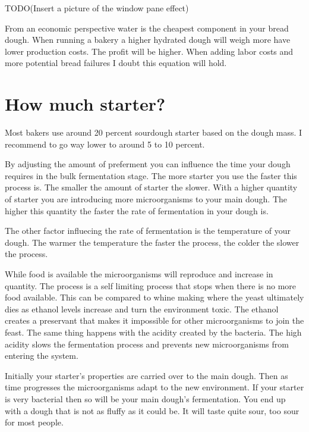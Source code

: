 TODO(Insert a picture of the window pane effect)

From an economic perspective water is the cheapest component in your bread
dough. When running a bakery a higher hydrated dough will weigh more have
lower production costs. The profit will be higher. When adding labor costs and
more potential bread failures I doubt this equation will hold.

\section{How much starter?}

Most bakers use around 20 percent sourdough starter based on the dough mass. I
recommend to go way lower to around 5 to 10 percent.

By adjusting the amount of preferment you can influence the time your dough
requires in the bulk fermentation stage. The more starter you use the faster
this process is. The smaller the amount of starter the slower. With a higher
quantity of starter you are introducing more microorganisms to your main
dough. The higher this quantity the faster the rate of fermentation in your
dough is.

The other factor influecing the rate of fermentation is the temperature of
your dough. The warmer the temperature the faster the process, the colder the
slower the process.

While food is available the microorganisms will reproduce and increase in
quantity. The process is a self limiting process that stops when there is no
more food available. This can be compared to whine making where
the yeast ultimately dies as ethanol levels increase and turn the environment
toxic. The ethanol creates a preservant that makes it impossible for other
microorganisms to join the feast. The same thing happens with the acidity
created by the bacteria. The high acidity slows the fermentation process and
prevents new microorganisms from entering the system.

Initially your starter's properties are carried over to the main dough. Then
as time progresses the microorganisms adapt to the new environment. If your
starter is very bacterial then so will be your main dough's fermentation. You
end up with a dough that is not as fluffy as it could be. It will taste quite
sour, too sour for most people.

